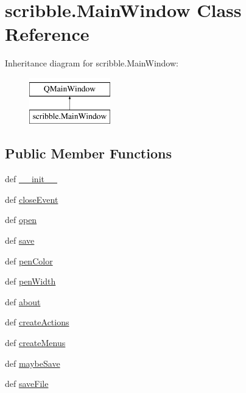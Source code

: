 \hypertarget{classscribble_1_1MainWindow}{}\section{scribble.\+Main\+Window Class Reference}
\label{classscribble_1_1MainWindow}
Inheritance diagram for scribble.\+Main\+Window\+:\begin{figure}[H]
\begin{center}
\leavevmode
\includegraphics[height=2.000000cm]{classscribble_1_1MainWindow}
\end{center}
\end{figure}
\subsection*{Public Member Functions}
\begin{DoxyCompactItemize}
\item 
def \hyperlink{classscribble_1_1MainWindow_aa38e3010701ef531e9860c4383bca56d}{\+\_\+\+\_\+init\+\_\+\+\_\+}
\item 
def \hyperlink{classscribble_1_1MainWindow_a1c56d6b932f54147aa96f35db17d8371}{close\+Event}
\item 
def \hyperlink{classscribble_1_1MainWindow_a89d13b1edca2f8d1084a8dcc57cf1712}{open}
\item 
def \hyperlink{classscribble_1_1MainWindow_af73415c0acd6657cc10b4bb99ea78c43}{save}
\item 
def \hyperlink{classscribble_1_1MainWindow_a2d89faf26499bcc0f1d934e2c89daa21}{pen\+Color}
\item 
def \hyperlink{classscribble_1_1MainWindow_a127ca0bf785deb40d195547666ee3254}{pen\+Width}
\item 
def \hyperlink{classscribble_1_1MainWindow_ad54eb10dff9c41f7aa68afef4b3d49aa}{about}
\item 
def \hyperlink{classscribble_1_1MainWindow_a30dae114179cc3781cb42f0b31db7d9b}{create\+Actions}
\item 
def \hyperlink{classscribble_1_1MainWindow_a855748f23cc253c5369b293a00aefb94}{create\+Menus}
\item 
def \hyperlink{classscribble_1_1MainWindow_a9d647ac8a280ab270b1c26f5aca356e5}{maybe\+Save}
\item 
def \hyperlink{classscribble_1_1MainWindow_a6ef4e04d72602c0b7110eb265e8789ef}{save\+File}
\end{DoxyCompactItemize}

